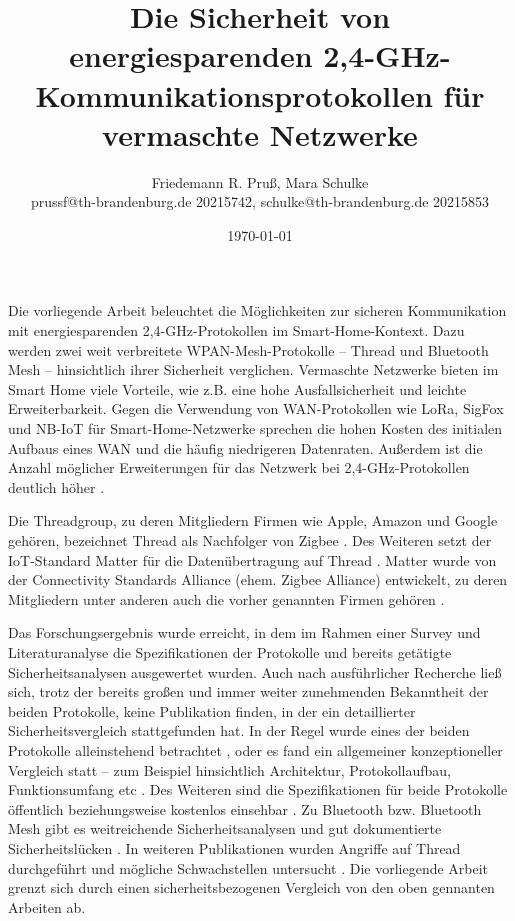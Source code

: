\documentclass{article}
\title{Die Sicherheit von energiesparenden 2,4-GHz-Kommunikationsprotokollen für vermaschte Netzwerke}
\author{\vspace{-0.1cm}\normalsize{Friedemann R. Pruß, Mara Schulke}\\\small{prussf@th-brandenburg.de 20215742, schulke@th-brandenburg.de 20215853}}
\date{\small{\today}\vspace{-0.1cm}}
\begin{document}
\maketitle
\thispagestyle{empty}
\pagestyle{empty}

Die vorliegende Arbeit beleuchtet die Möglichkeiten zur sicheren Kommunikation
mit energiesparenden 2,4-GHz-Protokollen im Smart-Home-Kontext. Dazu werden zwei
weit verbreitete WPAN-Mesh-Protokolle – Thread und Bluetooth Mesh –
hinsichtlich ihrer Sicherheit verglichen. Vermaschte Netzwerke bieten im Smart
Home viele Vorteile, wie z.B. eine hohe Ausfallsicherheit und leichte
Erweiterbarkeit. Gegen die Verwendung von WAN-Protokollen wie LoRa, SigFox und
NB-IoT für Smart-Home-Netzwerke sprechen die hohen Kosten des initialen Aufbaus
eines WAN und die häufig niedrigeren Datenraten. Außerdem ist die Anzahl
möglicher Erweiterungen für das Netzwerk bei 2,4-GHz-Protokollen
deutlich höher \parencite{ThreadMeshVsOtherWirelessIEEE}.

Die Threadgroup, zu deren Mitgliedern Firmen wie Apple, Amazon und Google
gehören, bezeichnet Thread als Nachfolger von Zigbee
\parencite{ThePromiseOfThread}. Des Weiteren
setzt der IoT-Standard Matter für die Datenübertragung auf Thread \parencite{Matter}.
Matter wurde von der Connectivity Standards Alliance (ehem. Zigbee Alliance)
entwickelt, zu deren Mitgliedern unter anderen auch die vorher genannten Firmen
gehören \parencite{Matter}.

Das Forschungsergebnis wurde erreicht, in dem im Rahmen einer Survey und
Literaturanalyse die Spezifikationen der Protokolle und bereits getätigte
Sicherheitsanalysen ausgewertet wurden. Auch nach ausführlicher Recherche ließ
sich, trotz der bereits großen und immer weiter zunehmenden Bekanntheit der
beiden Protokolle, keine Publikation finden, in der ein detaillierter
Sicherheitsvergleich stattgefunden hat. In der Regel wurde eines der beiden
Protokolle alleinstehend betrachtet
\parencite{ThreadApplicationIEEE,BluetoothMeshIntro}, oder es fand ein
allgemeiner konzeptioneller Vergleich statt – zum Beispiel hinsichtlich
Architektur, Protokollaufbau, Funktionsumfang etc
\parencite{ComparativeAnalysisIEEE,ThreadMeshVsOtherWirelessIEEE}. Des Weiteren
sind die Spezifikationen für beide Protokolle öffentlich beziehungsweise
kostenlos einsehbar \parencite{BluetoothSpec,ThreadSpec}. Zu Bluetooth bzw.
Bluetooth Mesh gibt es weitreichende Sicherheitsanalysen und gut dokumentierte
Sicherheitslücken \parencite{BluetoothLowEnergyAttackOxford, BluetoothIssues}.
In weiteren Publikationen wurden Angriffe auf Thread durchgeführt
\parencite{ThreadEMAttack} und mögliche Schwachstellen untersucht
\parencite{ThreadSecurityCSIAC}. Die vorliegende Arbeit grenzt sich durch einen
sicherheitsbezogenen Vergleich von den oben gennanten Arbeiten ab.
\end{document}
